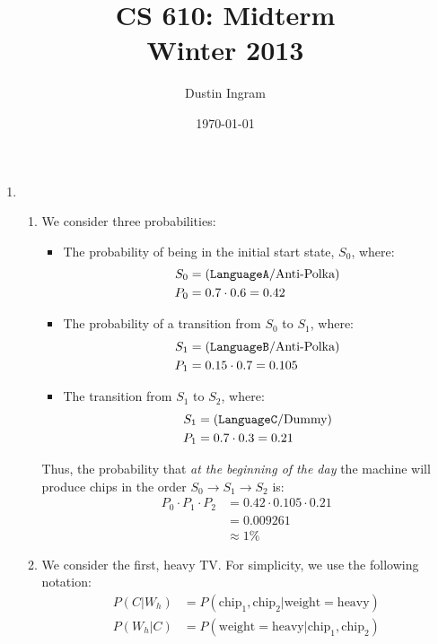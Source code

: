\documentclass{article}
\title{CS 610: Midterm\\Winter 2013}
\author{Dustin Ingram}
\date{\today}
\begin{document}
\maketitle

\begin{enumerate}[start=0]

\item{} %

\begin{enumerate}

\item{} %
    We consider three probabilities:
\begin{itemize}
    \item{The probability of being in the initial start state, $S_0$, where:}
    \begin{align*}
        S_0 &= \text{(\texttt{LanguageA}/Anti-Polka)}\\
        P_0 &= 0.7 \cdot 0.6 = 0.42
    \end{align*}
    \item{The probability of a transition from $S_0$ to $S_1$, where:}
    \begin{align*}
        S_1 &= \text{(\texttt{LanguageB}/Anti-Polka)}\\
        P_1 &= 0.15 \cdot 0.7 = 0.105
    \end{align*}
    \item{The transition from $S_1$ to $S_2$, where:}
    \begin{align*}
        S_1 &= \text{(\texttt{LanguageC}/Dummy)}\\
        P_1 &= 0.7 \cdot 0.3 = 0.21
    \end{align*}
\end{itemize}
Thus, the probability that \emph{at the beginning of the day} the machine will
produce chips in the order $S_0 \to S_1 \to S_2$ is:
\begin{align*}
    P_0 \cdot P_1 \cdot P_2 &= 0.42 \cdot 0.105 \cdot 0.21\\
    &= 0.009261\\
    &\approx 1\%
\end{align*}
\item{}
    We consider the first, heavy TV. For simplicity, we use the following
    notation:
    \begin{align*}
    P(C|W_h) &= P(\text{chip}_1, \text{chip}_2 | \text{weight} = \text{heavy})\\
    P(W_h|C) &= P(\text{weight} = \text{heavy} | \text{chip}_1, \text{chip}_2)\\

\end{align*}
\end{enumerate}
\end{enumerate}
\end{document}
